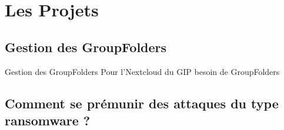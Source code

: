 \section{Les Projets}
\subsection{Gestion des GroupFolders}
\begin{frame}{Gestion des GroupFolders}
Pour l'Nextcloud du GIP besoin de GroupFolders 
\end{frame}
\subsection{Comment se prémunir des attaques du type ransomware ?}
\begin{frame}

\end{frame}
